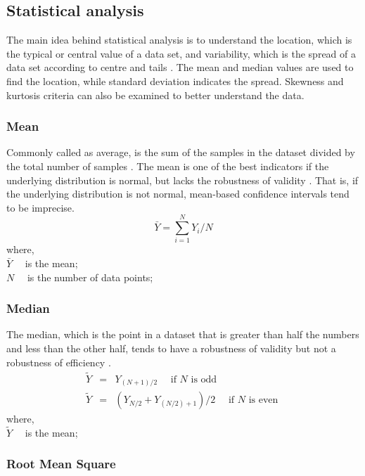 \subsection{Statistical analysis}

The main idea behind statistical analysis is to understand the location, which is the typical or central value of a data set, and variability, which is the spread of a data set according to centre and tails \cite{croarkin2012handbook}. The mean and median values are used to find the location, while standard deviation indicates the spread. Skewness and kurtosis criteria can also be examined to better understand the data. 

\subsubsection{Mean}

Commonly called as average, is the sum of the samples in the dataset divided by the total number of samples \cite{shukla2015analysis}. The mean is one of the best indicators if the underlying distribution is normal, but lacks the robustness of validity \cite{croarkin2012handbook}. That is, if the underlying distribution is not normal, mean-based confidence intervals tend to be imprecise.
\begin{equation}
\bar{Y}=\sum_{i=1}^{N} Y_{i} / N
\label{mean}
\end{equation}
where,\\
$\bar{Y} \quad$ is the mean;\\
$N \quad$ is the number of data points;
\subsubsection{Median}

The median, which is the point in a dataset that is greater than half the numbers and less than the other half, tends to have a robustness of validity but not a robustness of efficiency \cite{croarkin2012handbook,shukla2015analysis}.
\begin{eqnarray}
\tilde{Y} &=& Y_{(N+1) / 2} \quad \text { if } N \text { is odd }\\
\tilde{Y} &=& \left(Y_{N / 2}+Y_{(N / 2)+1}\right) / 2 \quad \text { if } N \text { is even }
\label{median}
\end{eqnarray}
where,\\
$\tilde{Y} \quad$ is the mean;
\subsubsection{Root Mean Square}

